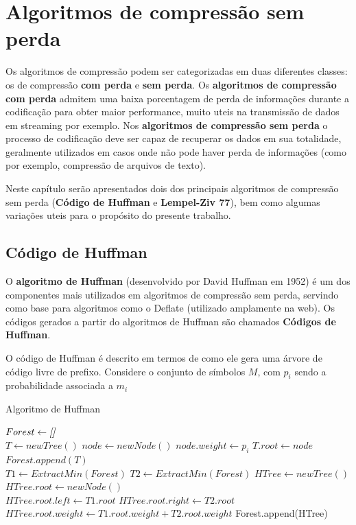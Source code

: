 \chapter{Algoritmos de compressão sem perda}

Os algoritmos de compressão podem ser categorizadas em duas diferentes classes: os de compressão \textbf{com perda} e \textbf{sem perda}. 
Os \textbf{algoritmos de compressão com perda} admitem uma baixa porcentagem de perda de informações durante a codificação para obter maior performance, muito uteis na transmissão de dados em streaming por exemplo. 
Nos \textbf{algoritmos de compressão sem perda} o processo de codificação deve ser capaz de recuperar os dados em sua totalidade, geralmente utilizados em casos onde não pode haver perda de informações (como por exemplo, compressão de arquivos de texto).

Neste capítulo serão apresentados dois dos principais algoritmos de compressão sem perda (\textbf{Código de Huffman} e \textbf{Lempel-Ziv 77}), bem como algumas variações uteis para o propósito do presente trabalho.

\pagebreak

\section{Código de Huffman} \label{sec:huff}
O \textbf{algoritmo de Huffman} (desenvolvido por David Huffman em 1952) é um dos componentes mais utilizados em algoritmos de compressão sem perda, servindo como base para algoritmos como o Deflate (utilizado amplamente na web).
Os códigos gerados a partir do algoritmos de Huffman são chamados \textbf{Códigos de Huffman}.

O código de Huffman é descrito em termos de como ele gera uma árvore de código livre de prefixo. 
Considere o conjunto de símbolos $M$, com $p_i$ sendo a probabilidade associada a $m_i$

\begin{algorithm}[H]
\caption{Algoritmo de Huffman} \label{alg:huff}
\begin{algorithmic}
	\State $Forest \gets \emph{[]}$\\
	 
		\State $T \gets newTree()$
		\State $node \gets newNode()$
		\State $node.weight \gets p_i$ 
		\State $T.root \gets node$
		\State $Forest.append(T)$ 
	\EndFor \\
	
		\State $T1 \gets ExtractMin(Forest)$ 
		\State $T2 \gets ExtractMin(Forest)$
		\State $HTree \gets newTree()$
		\State $HTree.root \gets newNode()$ \\
		\State $HTree.root.left \gets T1.root$
		\State $HTree.root.right \gets T2.root$
		\State $HTree.root.weight \gets T1.root.weight + T2.root.weight$
		\State Forest.append(HTree) 
	\EndWhile
\end{algorithmic}
\end{algorithm}

